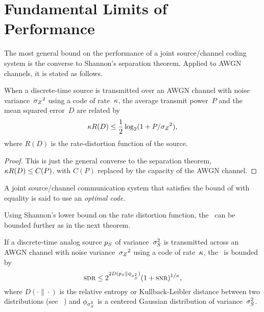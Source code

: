 \section{Fundamental Limits of Performance}
\label{sec:limits}

The most general bound on the performance of a joint source/channel coding
system is the converse to Shannon's separation theorem. Applied to AWGN
channels, it is stated as follows.

\begin{theorem}
  \label{thm:sepconverse}
  When a discrete-time source is transmitted over an AWGN channel with noise
  variance~${{\sigma_Z}^2}$ using a code of rate~$\kappa$, the average transmit power~$P$ and
  the mean squared error~$D$ are related by
  \begin{equation}
    \label{eq:sepconverse}
    \kappa R(D) \le \frac12 \log_2(1 + P/{{\sigma_Z}^2}),
  \end{equation}
  where $R(D)$ is the rate-distortion function of the source.
\end{theorem}

\begin{proof}
  This is just the general converse to the separation theorem, $\kappa R(D) \le
  C(P)$, with $C(P)$ replaced by the capacity of the AWGN channel.
\end{proof}

\begin{definition}
  \label{def:optimalcode}
  A joint source/channel communication system that satisfies the bound of
   with equality is said to use an \emph{optimal code}.
\end{definition}

Using Shannon's lower bound on the rate distortion function, the \sdr\ can be
bounded further as in the next theorem.
\begin{theorem}
  \label{thm:sdrlb}
  If a discrete-time analog source ${p_S}$ of variance~${\sigma_S^2}$ is transmitted
  across an AWGN channel with noise variance~${{\sigma_Z}^2}$ using a code of rate~$\kappa$,
  the \sdr\ is bounded by
  \begin{equation}
    \label{eq:sdrlb}
    \sdr \le 2^{2 D(\pS \| \phi_{\ssq})} (1 + \snr)^{1/\k},
  \end{equation}
  where $D(\cdot \| \cdot)$ is the relative entropy or Kullback-Leibler distance
  between two distributions (see \eg~\cite{CoverT1991}) and $\phi_{{\sigma_S^2}}$ is a
  centered Gaussian distribution of variance~${\sigma_S^2}$.
\end{theorem}

